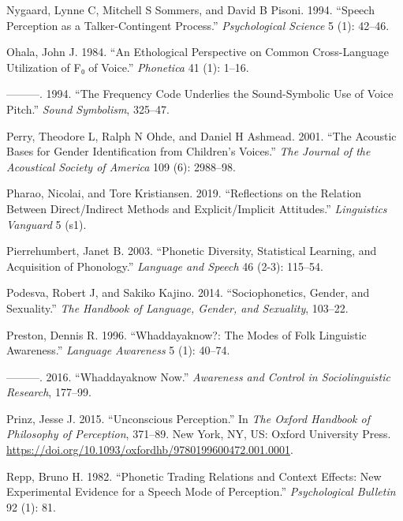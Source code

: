 \documentclass[
  letterpaper,
  DIV=11,
  numbers=noendperiod]{scrartcl}
\newlength{\cslhangindent}
\newenvironment{CSLReferences}[2] %
 {\begin{list}{}{%
  \setlength{\itemindent}{0pt}
  \setlength{\leftmargin}{0pt}
  \setlength{\parsep}{0pt}
  \ifodd #1
   \setlength{\leftmargin}{\cslhangindent}
   \setlength{\itemindent}{-1\cslhangindent}
  \fi
  \setlength{\itemsep}{#2\baselineskip}}}
 {\end{list}}
\begin{document}
\begin{CSLReferences}{1}{0}
Nygaard, Lynne C, Mitchell S Sommers, and David B Pisoni. 1994.
{``Speech Perception as a Talker-Contingent Process.''}
\emph{Psychological Science} 5 (1): 42--46.

Ohala, John J. 1984. {``An Ethological Perspective on Common
Cross-Language Utilization of F₀ of Voice.''} \emph{Phonetica} 41 (1):
1--16.

---------. 1994. {``The Frequency Code Underlies the Sound-Symbolic Use
of Voice Pitch.''} \emph{Sound Symbolism}, 325--47.

Perry, Theodore L, Ralph N Ohde, and Daniel H Ashmead. 2001. {``The
Acoustic Bases for Gender Identification from Children's Voices.''}
\emph{The Journal of the Acoustical Society of America} 109 (6):
2988--98.

Pharao, Nicolai, and Tore Kristiansen. 2019. {``Reflections on the
Relation Between Direct/Indirect Methods and Explicit/Implicit
Attitudes.''} \emph{Linguistics Vanguard} 5 (s1).

Pierrehumbert, Janet B. 2003. {``Phonetic Diversity, Statistical
Learning, and Acquisition of Phonology.''} \emph{Language and Speech} 46
(2-3): 115--54.

Podesva, Robert J, and Sakiko Kajino. 2014. {``Sociophonetics, Gender,
and Sexuality.''} \emph{The Handbook of Language, Gender, and
Sexuality}, 103--22.

Preston, Dennis R. 1996. {``Whaddayaknow?: The Modes of Folk Linguistic
Awareness.''} \emph{Language Awareness} 5 (1): 40--74.

---------. 2016. {``Whaddayaknow Now.''} \emph{Awareness and Control in
Sociolinguistic Research}, 177--99.

Prinz, Jesse J. 2015. {``Unconscious Perception.''} In \emph{The
{Oxford} Handbook of Philosophy of Perception}, 371--89. New York, NY,
US: Oxford University Press.
\url{https://doi.org/10.1093/oxfordhb/9780199600472.001.0001}.

Repp, Bruno H. 1982. {``Phonetic Trading Relations and Context Effects:
New Experimental Evidence for a Speech Mode of Perception.''}
\emph{Psychological Bulletin} 92 (1): 81.


\end{CSLReferences}
\end{document}
